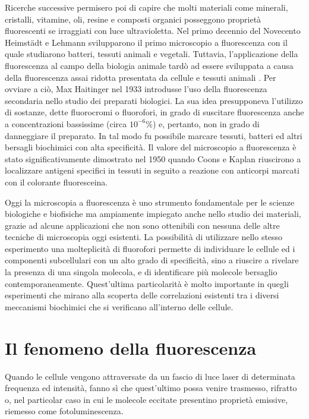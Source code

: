 Ricerche successive permisero poi di capire che molti materiali come minerali, cristalli, vitamine, oli, resine e composti organici posseggono proprietà fluorescenti se irraggiati con luce ultravioletta. 
Nel primo decennio del Novecento Heimstädt e Lehmann svilupparono il primo microscopio a fluorescenza con il quale studiarono batteri, tessuti animali e vegetali.
Tuttavia, l'applicazione della fluorescenza al campo della biologia animale tardò ad essere sviluppata a causa della fluorescenza assai ridotta presentata da cellule e tessuti animali \cite{storia}.
Per ovviare a ciò, Max Haitinger nel 1933 introdusse l'uso della fluorescenza secondaria nello studio dei preparati biologici.
La sua idea presupponeva l'utilizzo di sostanze, dette fluorocromi o fluorofori, in grado di suscitare fluorescenza anche a concentrazioni bassissime (circa $10^{-6}$\%) e, pertanto, non in grado di danneggiare il preparato. 
In tal modo fu possibile marcare tessuti, batteri ed altri bersagli biochimici con alta specificità.
Il valore del microscopio a fluorescenza è stato significativamente dimostrato nel 1950 quando Coons e Kaplan riuscirono a localizzare antigeni specifici in tessuti in seguito a reazione con anticorpi marcati con il colorante fluoresceina.

Oggi la microscopia a fluorescenza è uno strumento fondamentale per le scienze biologiche e biofisiche ma ampiamente impiegato anche nello studio dei materiali, grazie ad alcune applicazioni che non sono ottenibili con nessuna delle altre tecniche di microscopia oggi esistenti. 
La possibilità di utilizzare nello stesso esperimento una molteplicità di fluorofori permette di individuare le cellule ed i componenti subcellulari con un alto grado di specificità, sino a riuscire a rivelare la presenza di una singola molecola, e di identificare più molecole bersaglio contemporaneamente.
Quest'ultima particolarità è molto importante in quegli esperimenti che mirano alla scoperta delle correlazioni esistenti tra i diversi meccanismi biochimici che si verificano all'interno delle cellule.


\section{Il fenomeno della fluorescenza}

Quando le cellule vengono attraversate da un fascio di luce laser di determinata frequenza ed intensità, fanno sì che quest'ultimo possa venire trasmesso, rifratto o, nel particolar caso in cui le molecole eccitate presentino proprietà emissive, riemesso come fotoluminescenza. 

